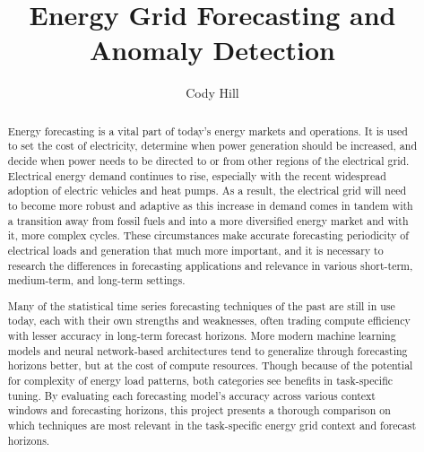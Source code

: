 \documentclass[sigconf]{acmart}
\begin{document}
\title{Energy Grid Forecasting and Anomaly Detection}


\author{Cody Hill}


\renewcommand{\shortauthors}{C. Hill}

\begin{abstract}
Energy forecasting is a vital part of today's energy markets and operations. It is used to set the cost of electricity, determine when power generation should be increased, and decide when power needs to be directed to or from other regions of the electrical grid. Electrical energy demand continues to rise, especially with the recent widespread adoption of electric vehicles and heat pumps. As a result, the electrical grid will need to become more robust and adaptive as this increase in demand comes in tandem with a transition away from fossil fuels and into a more diversified energy market and with it, more complex cycles. These circumstances make accurate forecasting periodicity of electrical loads and generation that much more important, and it is necessary to research the differences in forecasting applications and relevance in various short-term, medium-term, and long-term settings.

Many of the statistical time series forecasting techniques of the past are still in use today, each with their own strengths and weaknesses, often trading compute efficiency with lesser accuracy in long-term forecast horizons. More modern machine learning models and neural network-based architectures tend to generalize through forecasting horizons better, but at the cost of compute resources. Though because of the potential for complexity of energy load patterns, both categories see benefits in task-specific tuning. By evaluating each forecasting model's accuracy across various context windows and forecasting horizons, this project presents a thorough comparison on which techniques are most relevant in the task-specific energy grid context and forecast horizons.
\end{abstract}
\end{document}
